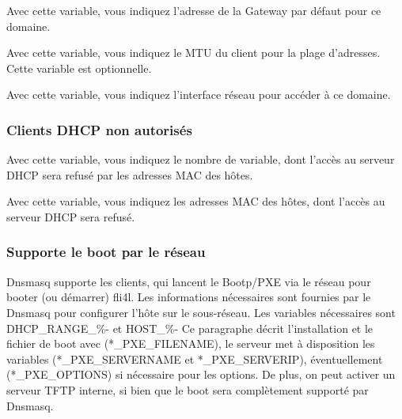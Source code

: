 \begin{description}
    {Avec cette variable, vous indiquez l'adresse de la Gateway par défaut pour ce domaine.}


    {Avec cette variable, vous indiquez le MTU du client pour la plage d'adresses.
	Cette variable est optionnelle.}


    {Avec cette variable, vous indiquez l'interface réseau pour accéder à ce domaine.}
\end{description}


\subsubsection{Clients DHCP non autorisés}

\begin{description}

    {Avec cette variable, vous indiquez le nombre de variable, dont l'accès au serveur DHCP
	sera refusé par les adresses MAC des hôtes.}


    {Avec cette variable, vous indiquez les adresses MAC des hôtes, dont l'accès
     au serveur DHCP sera refusé.}
\end{description}


\subsubsection{Supporte le boot par le réseau}

  Dnsmasq supporte les clients, qui lancent le Bootp/PXE via le réseau pour
  booter (ou démarrer) fli4l. Les informations nécessaires sont fournies par le
  Dnsmasq pour configurer l'hôte sur le sous-réseau. Les variables nécessaires
  sont DHCP\_RANGE\_\%- et HOST\_\%- Ce paragraphe décrit l'installation et le
  fichier de boot avec (*\_PXE\_FILENAME), le serveur met à disposition les variables
  (*\_PXE\_SERVERNAME et *\_PXE\_SERVERIP), éventuellement (*\_PXE\_OPTIONS)
  si nécessaire pour les options. De plus, on peut activer un serveur TFTP
  interne, si bien que le boot sera complètement supporté par Dnsmasq.

